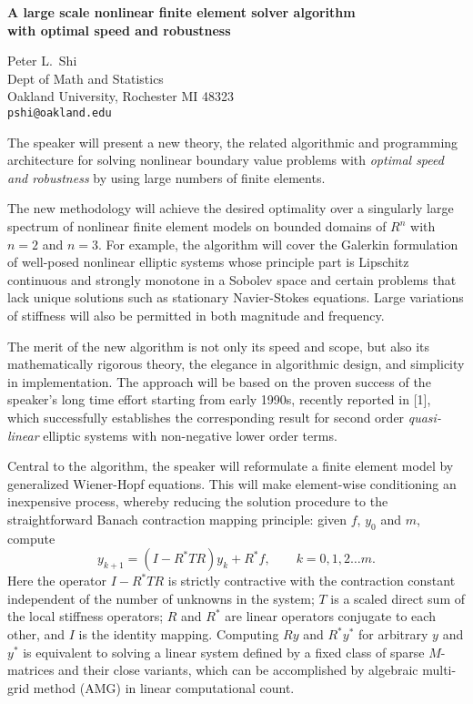 \documentclass{report}
\begin{document}

\begin{center}
{\large
{\bf A large scale nonlinear finite element solver algorithm \\
	with optimal speed and robustness}}

	Peter L.~Shi \\
	Dept of Math and Statistics \\
	Oakland University, Rochester MI 48323 \\
	{\tt pshi@oakland.edu}
\end{center}
The speaker will present a new theory, the related
algorithmic and programming architecture for solving
nonlinear boundary value problems with {\it optimal speed
and robustness} by using large numbers of finite elements.

The new methodology will achieve the desired optimality
over a singularly large spectrum of nonlinear finite element
models on bounded domains of $R^n$ with $n=2$ and $n=3$.
For example,
the algorithm will cover the Galerkin formulation
of well-posed nonlinear elliptic systems whose principle
part is Lipschitz continuous and strongly monotone in a
Sobolev space and certain problems that lack unique
solutions such as stationary Navier-Stokes equations. Large
variations of stiffness will also be permitted in both
magnitude and frequency.

The merit of the new algorithm
is not only its speed and scope, but also its mathematically
rigorous theory, the elegance in algorithmic design, and
simplicity in implementation. The approach will be based on
the proven success of the speaker's long time effort
starting from early 1990s, recently reported in [1],
which successfully establishes the corresponding
result for second order {\it quasi-linear} elliptic systems
with non-negative lower order terms.

Central to the
algorithm, the speaker will reformulate a finite element
model by generalized Wiener-Hopf equations. This will make
element-wise conditioning an inexpensive process, whereby
reducing the solution procedure to the straightforward
Banach contraction mapping principle: given $f$, $y_0$ and
$m$, compute
$$ y_{k+1} = (I-R^* T R) y_k+ R^*f,
\qquad k=0,1,2\dots m. $$
Here the operator $I- R^* T R$ is
strictly contractive with the contraction constant
independent of the number of unknowns in the system; $T$ is
a scaled direct sum of the local stiffness operators; $R$
and $R^*$ are linear operators conjugate to each other, and
$I$ is the identity mapping. Computing $Ry$ and $R^* y^*$ for
arbitrary $y$ and $y^*$ is equivalent to solving a linear
system defined by a fixed class of sparse $M$-matrices and
their close variants, which can be accomplished by algebraic
multi-grid method (AMG) in linear computational count.
\end{document}
